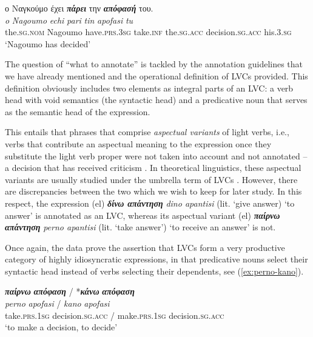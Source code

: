 \documentclass[output=paper,colorlinks,citecolor=brown]{langscibook}
\begin{document}
\ea
\label{ex:perno-mod}
\settowidth {}
 \glll
ο Ναγκούμο έχει \textbf{\em{πάρει}} την \textbf{\em{απόφασή}} του. \\
\textit{o} \textit{Nagoumo} \textit{echi} \textit{pari} \textit{tin} \textit{apofasi} \textit{tu} \\
the.\textsc{sg.nom} Nagoumo have.\textsc{prs.3sg} take.\textsc{inf} the.\textsc{sg.acc} decision.\textsc{sg.acc} his.\textsc{3.sg} \\
\glt `Nagoumo has decided' \\
\z

The question of ``what to annotate'' is tackled by the annotation guidelines that we have already mentioned and the operational definition of LVCs provided. This definition obviously includes two elements as integral parts of an LVC: a verb head with void semantics (the syntactic head) and a predicative noun that serves as the semantic head of the expression. 


This entails that phrases that comprise \textit{aspectual variants} of light verbs, i.e., verbs that contribute an aspectual meaning to the expression once they substitute the light verb proper were not taken into account and not annotated -- a decision that has received criticism \citep{fotopoulou-etal-2021-aspectual}. In theoretical linguistics, these aspectual variants are usually studied under the umbrella term of LVCs \citep{gross_1982, Giry-Schneider-1987}. However, there are discrepancies between the two which we wish to keep for later study.
In this respect, the expression (el) \textbf{\em{δίνω απάντηση}} \textit{dino apantisi} (lit. `give answer) `to answer' is annotated as an LVC, whereas its aspectual variant (el) \textbf{\em{παίρνω απάντηση}} \textit{perno apantisi} (lit. `take answer') `to receive an answer' is not.

Once again, the data prove the assertion that LVCs form a very productive category of highly idiosyncratic expressions, in that predicative nouns select their syntactic head instead of verbs selecting their dependents, see (\ref{ex:perno-kano}).  

\ea
 \label{ex:perno-kano}
 \settowidth {}
 \glll
 \textbf{\em{παίρνω}} \textbf{\em{απόφαση}} / *\textbf{\em{κάνω}} \textbf{\em{απόφαση}}\\ 
\textit{perno} \textit{apofasi} / \textit{kano} \textit{apofasi} \\
take.\textsc{prs.1sg} decision.\textsc{sg.acc} / make.\textsc{prs.1sg} decision.\textsc{sg.acc} \\
\glt `to make a decision, to decide' \\
\z
\end{document}
